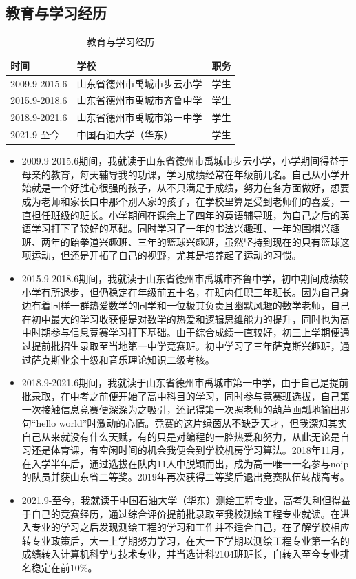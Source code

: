 \documentclass{article}
\begin{document}
\subsection{教育与学习经历}
\begin{table}[h]
	\centering
	\caption{教育与学习经历}
	\begin{tabular}{llc}
		\hline
		时间 & 学校 & 职务\\
		\hline
		2009.9-2015.6 & 山东省德州市禹城市步云小学 & 学生 \\ 
		2015.9-2018.6 & 山东省德州市禹城市齐鲁中学 & 学生 \\
		2018.9-2021.6 & 山东省德州市禹城市第一中学 & 学生 \\
		2021.9-至今 & 中国石油大学（华东） & 学生 \\
		\hline
	\end{tabular}
	\label{table1}
\end{table}
\begin{itemize}
	
\item 2009.9-2015.6期间，我就读于山东省德州市禹城市步云小学，小学期间得益于母亲的教育，每天辅导我的功课，学习成绩经常在年级前几名。自己从小学开始就是一个好胜心很强的孩子，从不只满足于成绩，努力在各方面做好，想要成为老师和家长口中那个别人家的孩子，在学校里算是受到老师们的喜爱，一直担任班级的班长。小学期间在课余上了四年的英语辅导班，为自己之后的英语学习打下了较好的基础。同时学习了一年的书法兴趣班、一年的围棋兴趣班、两年的跆拳道兴趣班、三年的篮球兴趣班，虽然坚持到现在的只有篮球这项运动，但还是开拓了自己的视野，尤其是培养起了运动的习惯。\par
\item 2015.9-2018.6期间，我就读于山东省德州市禹城市齐鲁中学，初中期间成绩较小学有所退步，但仍稳定在年级前五十名，在班内任职三年班长。因为自己身边有着同样一群热爱数学的同学和一位极其负责且幽默风趣的数学老师，自己在初中最大的学习收获便是对数学的热爱和逻辑思维能力的提升，同时也为高中时期参与信息竞赛学习打下基础。由于综合成绩一直较好，初三上学期便通过提前批招生录取至当地第一中学竞赛班。初中学习了三年萨克斯兴趣班，通过萨克斯业余十级和音乐理论知识二级考核。\par
\item 2018.9-2021.6期间，我就读于山东省德州市禹城市第一中学，由于自己是提前批录取，在中考之前便开始了高中科目的学习，同时参与竞赛班选拔，自己第一次接触信息竞赛便深深为之吸引，还记得第一次照老师的葫芦画瓢地输出那句“hello world”时激动的心情。竞赛的这片绿茵从不缺乏天才，但我深知其实自己从来就没有什么天赋，有的只是对编程的一腔热爱和努力，从此无论是自习还是体育课，有空闲时间的机会我便会到学校机房学习算法。2018年11月，在入学半年后，通过选拔在队内11人中脱颖而出，成为高一唯一一名参与noip的队员并获山东省二等奖。2019年再次获得二等奖后退出竞赛队伍转战高考。\par
\item 2021.9-至今，我就读于中国石油大学（华东）测绘工程专业，高考失利但得益于自己的竞赛经历，通过综合评价提前批录取至我校测绘工程专业就读。在进入专业的学习之后发现测绘工程的学习和工作并不适合自己，在了解学校相应转专业政策后，大一上学期努力学习，在大一下学期以测绘工程专业第一名的成绩转入计算机科学与技术专业，并当选计科2104班班长，自转入至今专业排名稳定在前10\%。 
\end{itemize}
\end{document}
